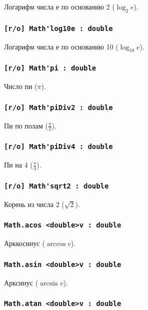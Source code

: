 Логарифм числа е по основанию 2 ($\log_{2}{e}$).

\subsubsection{\lstinline|[r/o] Math'log10e : double|}

Логарифм числа е по основанию 10 ($\log_{10}{e}$).

\subsubsection{\lstinline|[r/o] Math'pi : double|}

Число пи ($\pi$).

\subsubsection{\lstinline|[r/o] Math'piDiv2 : double|}

Пи по полам ($\frac{\pi}{2}$).

\subsubsection{\lstinline|[r/o] Math'piDiv4 : double|}

Пи на 4 ($\frac{\pi}{4}$).

\subsubsection{\lstinline|[r/o] Math'sqrt2 : double|}

Корень из числа 2 ($\sqrt{2}$).

\subsubsection{\lstinline|Math.acos <double>v : double|}

Арккосинус ($\arccos{v}$).

\subsubsection{\lstinline|Math.asin <double>v : double|}

Арксинус ($\arcsin{v}$).

\subsubsection{\lstinline|Math.atan <double>v : double|}

